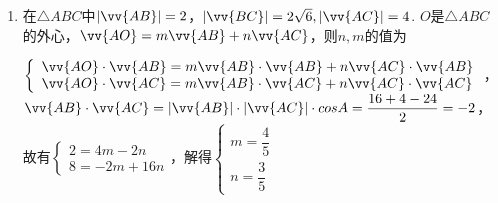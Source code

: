\begin{enumerate}
\begin{enumerate}
\begin{jieda}
            所以 $4{r}^{2} = 4{r}^{2} + {r}^{2} + {4r} \cdot  r\cos \angle {BOC} \Longrightarrow  \cos \angle {BOC} =  - \dfrac{1}{4}$ 
        \end{jieda}

        
        \item 在$\triangle ABC$中$|\vv{AB}| = 2$，$|\vv{BC}| = 2\sqrt{6}, |\vv{AC}| = 4$. $O$是$\triangle ABC$的外心，$\vv{AO} = m \vv{AB} + n \vv{AC}$，则$n,m$的值为
        \begin{jieda}
            $\left \{ \begin{array}{l}
                 \vv{AO} \cdot \vv{AB} = m\vv{AB} \cdot \vv{AB} + n \vv{AC} \cdot \vv{AB} \\
                 \vv{AO} \cdot \vv{AC} = m\vv{AB} \cdot \vv{AC} + n \vv{AC} \cdot \vv{AC}
            \end{array} \right.$，$\vv{AB}\cdot \vv{AC} = |\vv{AB}| \cdot |\vv{AC}| \cdot cosA = \dfrac{16+4-24}{2} = -2$，故有$\left \{ \begin{array}{l}
                2 = 4m - 2n \\
                8 = -2m + 16n
            \end{array} \right.$，解得$\left \{ \begin{array}{l}
                m = \dfrac{4}{5} \\
                n = \dfrac{3}{5}
            \end{array} \right.$
        \end{jieda}


\end{enumerate}
\end{enumerate}
